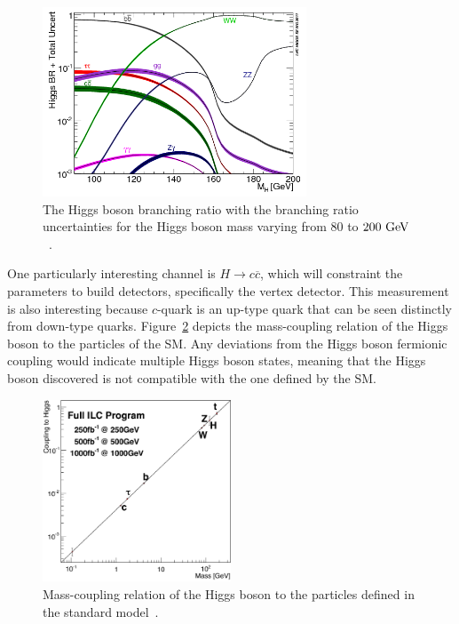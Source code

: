     \begin{figure}[!tbh]
      \centering
      \includegraphics[width = 0.7\textwidth]{Pictures/Higgs/BRTotalUncertBands_lm.png}
      \caption{The Higgs boson branching ratio with the branching ratio uncertainties for the Higgs boson mass varying from $80$ to $200~\rm{GeV}$~\cite{Denner:2011mq}.}
      \label{fig:higgsProd}
    \end{figure}

    One particularly interesting channel is $H \rightarrow c\overline{c}$, which will constraint the parameters to build detectors, specifically the vertex detector. 
    This measurement is also interesting because $c$-quark is an up-type quark that can be seen distinctly from down-type quarks.
    Figure~\ref{fig:coupling} depicts the mass-coupling relation of the Higgs boson to the particles of the \gls{SM}.
    Any deviations from the Higgs boson fermionic coupling would indicate multiple Higgs boson states, meaning that the Higgs boson discovered is not compatible with the one defined by the \gls{SM}.

    \begin{figure}[!tbh]
      \centering
      \includegraphics[width = 0.5\textwidth]{Pictures/Higgs/Chapter_Theory_figs_mass-coupling1TeV.png}
      \caption{Mass-coupling relation of the Higgs boson to the particles defined in the standard model~\cite{tian}.}
      \label{fig:coupling}
    \end{figure}
    
